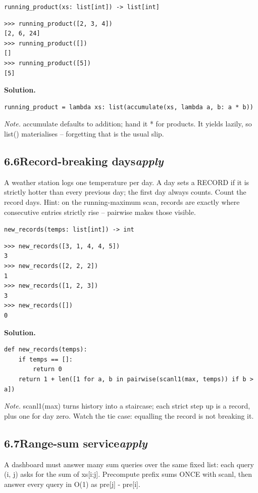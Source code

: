 \documentclass[10pt,letterpaper]{book}
\begin{document}
\noindent\texttt{running\_product(xs: list[int]) -> list[int]}
\begin{lstlisting}[style=ex]
>>> running_product([2, 3, 4])
[2, 6, 24]
>>> running_product([])
[]
>>> running_product([5])
[5]
\end{lstlisting}
\noindent\textbf{Solution.}
\begin{lstlisting}[style=code]
running_product = lambda xs: list(accumulate(xs, lambda a, b: a * b))
\end{lstlisting}
\noindent\textit{Note.} accumulate defaults to addition; hand it * for products. It yields lazily, so list() materialises -- forgetting that is the usual slip.

\subsection*{6.6\quad Record-breaking days\hfill\textnormal{\textit{apply}}}
A weather station logs one temperature per day. A day sets a RECORD if it is strictly hotter than every previous day; the first day always counts. Count the record days. Hint: on the running-maximum scan, records are exactly where consecutive entries strictly rise -- pairwise makes those visible.

\noindent\texttt{new\_records(temps: list[int]) -> int}
\begin{lstlisting}[style=ex]
>>> new_records([3, 1, 4, 4, 5])
3
>>> new_records([2, 2, 2])
1
>>> new_records([1, 2, 3])
3
>>> new_records([])
0
\end{lstlisting}
\noindent\textbf{Solution.}
\begin{lstlisting}[style=code]
def new_records(temps):
    if temps == []:
        return 0
    return 1 + len([1 for a, b in pairwise(scanl1(max, temps)) if b > a])
\end{lstlisting}
\noindent\textit{Note.} scanl1(max) turns history into a staircase; each strict step up is a record, plus one for day zero. Watch the tie case: equalling the record is not breaking it.

\subsection*{6.7\quad Range-sum service\hfill\textnormal{\textit{apply}}}
A dashboard must answer many sum queries over the same fixed list: each query (i, j) asks for the sum of xs[i:j]. Precompute prefix sums ONCE with scanl, then answer every query in O(1) as pre[j] - pre[i].
\end{document}
